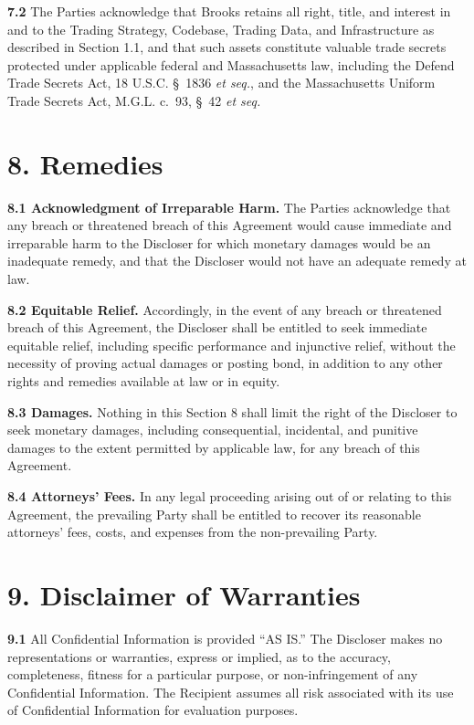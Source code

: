 \documentclass{article}
\begin{document}
\textbf{7.2} The Parties acknowledge that Brooks retains all right, title, and interest in and to the Trading Strategy, Codebase, Trading Data, and Infrastructure as described in Section 1.1, and that such assets constitute valuable trade secrets protected under applicable federal and Massachusetts law, including the Defend Trade Secrets Act, 18 U.S.C. \S~1836 \textit{et seq.}, and the Massachusetts Uniform Trade Secrets Act, M.G.L. c.~93, \S~42 \textit{et seq.}

\section{8. Remedies}

\textbf{8.1 Acknowledgment of Irreparable Harm.} The Parties acknowledge that any breach or threatened breach of this Agreement would cause immediate and irreparable harm to the Discloser for which monetary damages would be an inadequate remedy, and that the Discloser would not have an adequate remedy at law.

\textbf{8.2 Equitable Relief.} Accordingly, in the event of any breach or threatened breach of this Agreement, the Discloser shall be entitled to seek immediate equitable relief, including specific performance and injunctive relief, without the necessity of proving actual damages or posting bond, in addition to any other rights and remedies available at law or in equity.

\textbf{8.3 Damages.} Nothing in this Section 8 shall limit the right of the Discloser to seek monetary damages, including consequential, incidental, and punitive damages to the extent permitted by applicable law, for any breach of this Agreement.

\textbf{8.4 Attorneys' Fees.} In any legal proceeding arising out of or relating to this Agreement, the prevailing Party shall be entitled to recover its reasonable attorneys' fees, costs, and expenses from the non-prevailing Party.

\section{9. Disclaimer of Warranties}

\textbf{9.1} All Confidential Information is provided ``AS IS.'' The Discloser makes no representations or warranties, express or implied, as to the accuracy, completeness, fitness for a particular purpose, or non-infringement of any Confidential Information. The Recipient assumes all risk associated with its use of Confidential Information for evaluation purposes.
\end{document}
